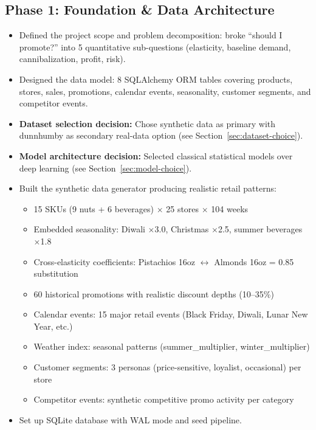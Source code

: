 \documentclass[11pt, a4paper]{article}
\begin{document}
\subsection{Phase 1: Foundation \& Data Architecture}
\begin{itemize}[leftmargin=1.5em]
    \item Defined the project scope and problem decomposition: broke ``should I promote?'' into 5 quantitative sub-questions (elasticity, baseline demand, cannibalization, profit, risk).
    \item Designed the data model: 8 SQLAlchemy ORM tables covering products, stores, sales, promotions, calendar events, seasonality, customer segments, and competitor events.
    \item \textbf{Dataset selection decision:} Chose synthetic data as primary with dunnhumby as secondary real-data option (see Section~\ref{sec:dataset-choice}).
    \item \textbf{Model architecture decision:} Selected classical statistical models over deep learning (see Section~\ref{sec:model-choice}).
    \item Built the synthetic data generator producing realistic retail patterns:
    \begin{itemize}
        \item 15 SKUs (9 nuts + 6 beverages) $\times$ 25 stores $\times$ 104 weeks
        \item Embedded seasonality: Diwali $\times$3.0, Christmas $\times$2.5, summer beverages $\times$1.8
        \item Cross-elasticity coefficients: Pistachios 16oz $\leftrightarrow$ Almonds 16oz = 0.85 substitution
        \item 60 historical promotions with realistic discount depths (10--35\%)
        \item Calendar events: 15 major retail events (Black Friday, Diwali, Lunar New Year, etc.)
        \item Weather index: seasonal patterns (summer_multiplier, winter_multiplier)
        \item Customer segments: 3 personas (price-sensitive, loyalist, occasional) per store
        \item Competitor events: synthetic competitive promo activity per category
    \end{itemize}
    \item Set up SQLite database with WAL mode and seed pipeline.
\end{itemize}
\end{document}

